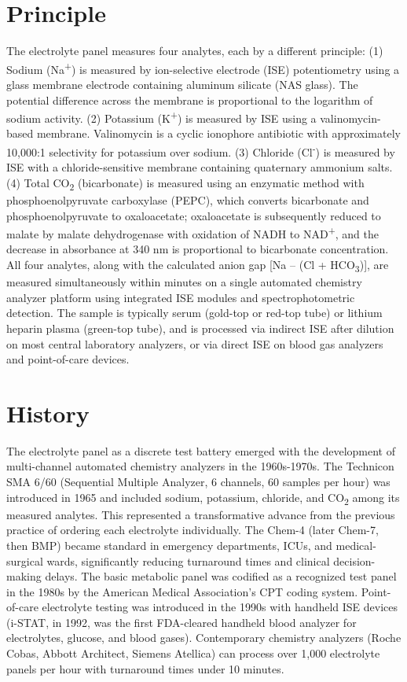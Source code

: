 \section*{Principle}
The electrolyte panel measures four analytes, each by a different principle: (1) Sodium (Na\textsuperscript{+}) is measured by ion-selective electrode (ISE) potentiometry using a glass membrane electrode containing aluminum silicate (NAS glass). The potential difference across the membrane is proportional to the logarithm of sodium activity. (2) Potassium (K\textsuperscript{+}) is measured by ISE using a valinomycin-based membrane. Valinomycin is a cyclic ionophore antibiotic with approximately 10,000:1 selectivity for potassium over sodium. (3) Chloride (Cl\textsuperscript{-}) is measured by ISE with a chloride-sensitive membrane containing quaternary ammonium salts. (4) Total CO\textsubscript{2} (bicarbonate) is measured using an enzymatic method with phosphoenolpyruvate carboxylase (PEPC), which converts bicarbonate and phosphoenolpyruvate to oxaloacetate; oxaloacetate is subsequently reduced to malate by malate dehydrogenase with oxidation of NADH to NAD\textsuperscript{+}, and the decrease in absorbance at 340 nm is proportional to bicarbonate concentration. All four analytes, along with the calculated anion gap [Na -- (Cl + HCO\textsubscript{3})], are measured simultaneously within minutes on a single automated chemistry analyzer platform using integrated ISE modules and spectrophotometric detection. The sample is typically serum (gold-top or red-top tube) or lithium heparin plasma (green-top tube), and is processed via indirect ISE after dilution on most central laboratory analyzers, or via direct ISE on blood gas analyzers and point-of-care devices.

\section*{History}
The electrolyte panel as a discrete test battery emerged with the development of multi-channel automated chemistry analyzers in the 1960s-1970s. The Technicon SMA 6/60 (Sequential Multiple Analyzer, 6 channels, 60 samples per hour) was introduced in 1965 and included sodium, potassium, chloride, and CO\textsubscript{2} among its measured analytes. This represented a transformative advance from the previous practice of ordering each electrolyte individually. The Chem-4 (later Chem-7, then BMP) became standard in emergency departments, ICUs, and medical-surgical wards, significantly reducing turnaround times and clinical decision-making delays. The basic metabolic panel was codified as a recognized test panel in the 1980s by the American Medical Association's CPT coding system. Point-of-care electrolyte testing was introduced in the 1990s with handheld ISE devices (i-STAT, in 1992, was the first FDA-cleared handheld blood analyzer for electrolytes, glucose, and blood gases). Contemporary chemistry analyzers (Roche Cobas, Abbott Architect, Siemens Atellica) can process over 1,000 electrolyte panels per hour with turnaround times under 10 minutes.

